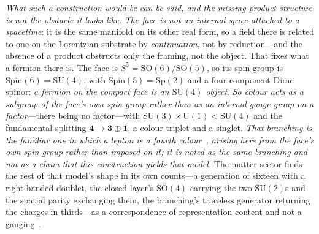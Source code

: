\documentclass[11pt]{article}
\theoremstyle{plain}
\theoremstyle{remark}
\newcommand{\SO}{\mathrm{SO}}
\newcommand{\SU}{\mathrm{SU}}
\begin{document}
\emph{What such a construction would be can be said, and the missing product structure is not the obstacle it looks like.} \emph{The face is not an internal space attached to a spacetime}: it is the same manifold on its other real form, so a field there is related to one on the Lorentzian substrate by \emph{continuation}, not by reduction---and the absence of a product obstructs only the framing, not the object. That fixes what a fermion there is. The face is $S^{5}=\SO(6)/\SO(5)$, so its spin group is $\mathrm{Spin}(6)=\SU(4)$, with $\mathrm{Spin}(5)=\mathrm{Sp}(2)$ and a four-component Dirac spinor: \emph{a fermion on the compact face is an $\SU(4)$ object}. \emph{So colour acts as a subgroup of the face's own spin group rather than as an internal gauge group on a factor}---there being no factor---with $\SU(3)\times\mathrm{U}(1)<\SU(4)$ and the fundamental splitting $\mathbf{4}\to\mathbf{3}\oplus\mathbf{1}$, a colour triplet and a singlet. \emph{That branching is the familiar one in which a lepton is a fourth colour~\cite{PatiSalam1974}, arising here from the face's own spin group rather than imposed on it; it is noted as the same branching and not as a claim that this construction yields that model.} The matter sector finds the rest of that model's shape in its own counts---a generation of sixteen with a right-handed doublet, the closed layer's $\SO(4)$ carrying the two $\SU(2)$s and the spatial parity exchanging them, the branching's traceless generator returning the charges in thirds---as a correspondence of representation content and not a gauging~\cite{JanzenMatter}.
\end{document}
